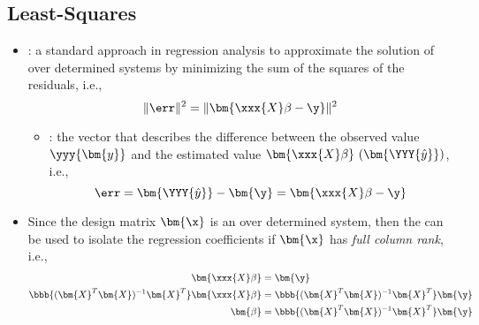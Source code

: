 \begin{itemize}
  \subsection{Least-Squares}
  \begin{itemize}
    \item {}: a standard approach in regression analysis to approximate the solution of over determined systems by minimizing the sum of the squares of the residuals, i.e.,
    \[%
    \| \err \|^2 = \| \bm{\xxx{X}\beta - \y}\|^2
    \]%
    \begin{itemize}
      \item {}: the vector that describes the difference{} between the observed value~\(\yyy{\bm{y}}\) and the estimated value \(\bm{\xxx{X}\beta}~(\bm{\YYY{\hat{y}}})\), i.e.,
      \[%
      \err = \bm{\YYY{\hat{y}}} - \bm{\y} = \bm{\xxx{X}\beta - \y}
      \]%
    \end{itemize}
  \item Since the design matrix \(\bm{\x}\) is an over determined system, then the  can be used to isolate the regression coefficients if \(\bm{\x}\) has \emph{full column rank}, i.e.,
  \begin{align*}
    \bm{\xxx{X}\beta} &= \bm{\y} \\
    \bbb{(\bm{X}^T \bm{X})^{-1} \bm{X}^T} \bm{\xxx{X}\beta} &= \bbb{(\bm{X}^T \bm{X})^{-1} \bm{X}^T} \bm{\y} \\
    \bm{\beta} &= \bbb{(\bm{X}^T \bm{X})^{-1} \bm{X}^T} \bm{\y}
  \end{align*}
  \end{itemize}


\end{itemize}
